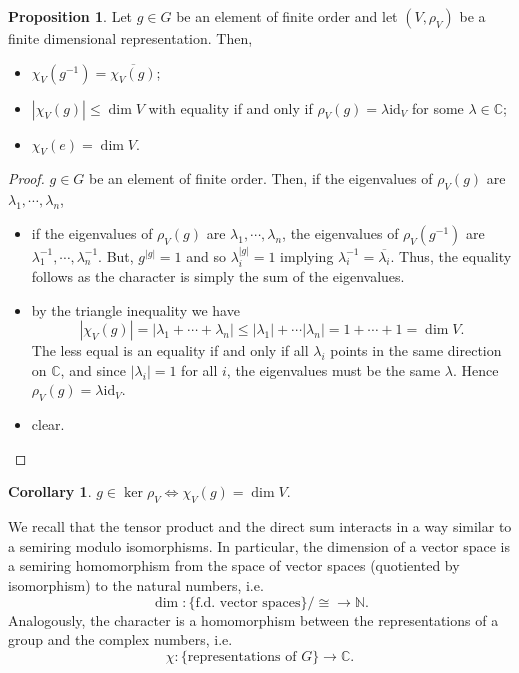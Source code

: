 \documentclass[]{article}
\theoremstyle{definition}
\newtheorem{corollary}{Corollary}[theorem]
\theoremstyle{definition}
\newtheorem{proposition}{Proposition}[section]
\begin{document}
\begin{proposition}
  Let \(g \in G\) be an element of finite order and let \((V, \rho_V)\) be a 
  finite dimensional representation. Then, 
  \begin{itemize}
    \item \(\chi_V(g^{-1}) = \overline{\chi_V(g)}\);
    \item \(|\chi_V(g)| \le \dim V\) with equality if and only if 
      \(\rho_V(g) = \lambda \text{id}_V\) for some \(\lambda \in \mathbb{C}\);
    \item \(\chi_V(e) = \dim V\).
  \end{itemize}
\end{proposition}
\begin{proof}
  \(g \in G\) be an element of finite order. Then, if the eigenvalues of 
  \(\rho_V(g)\) are \(\lambda_1, \cdots, \lambda_n\), 
  \begin{itemize}
    \item if the eigenvalues of \(\rho_V(g)\) are \(\lambda_1, \cdots, \lambda_n\), 
      the eigenvalues of \(\rho_V(g^{-1})\) are 
      \(\lambda_1^{-1}, \cdots, \lambda_n^{-1}\). But, \(g^{|g|} = 1\) and so 
      \(\lambda_i^{|g|} = 1\) implying \(\lambda_i^{-1} = \overline{\lambda_i}\).
      Thus, the equality follows as the character is simply the sum of the eigenvalues. 
    \item by the triangle inequality we have 
      \[|\chi_V(g)| = |\lambda_1 + \cdots + \lambda_n| \le 
        |\lambda_1| + \cdots |\lambda_n| = 1 + \cdots + 1 = \dim V.\]
      The less equal is an equality if and only if all \(\lambda_i\) points in the 
      same direction on \(\mathbb{C}\), and since \(|\lambda_i| = 1\) for all \(i\), 
      the eigenvalues must be the same \(\lambda\). Hence 
      \(\rho_V(g) = \lambda \text{id}_V\).
    \item clear.
  \end{itemize}
\end{proof}

\begin{corollary}
  \(g \in \ker \rho_V \iff \chi_V(g) = \dim V\).
\end{corollary}

We recall that the tensor product and the direct sum interacts in a way 
similar to a semiring modulo isomorphisms. In particular, the 
dimension of a vector space is a semiring homomorphism from the space 
of vector spaces (quotiented by isomorphism) to the natural numbers, i.e. 
\[\dim : \{\text{f.d. vector spaces}\} / \cong \to \mathbb{N}.\]
Analogously, the character is a homomorphism between the representations of 
a group and the complex numbers, i.e. 
\[\chi : \{\text{representations of } G\} \to \mathbb{C}.\]
\end{document}
